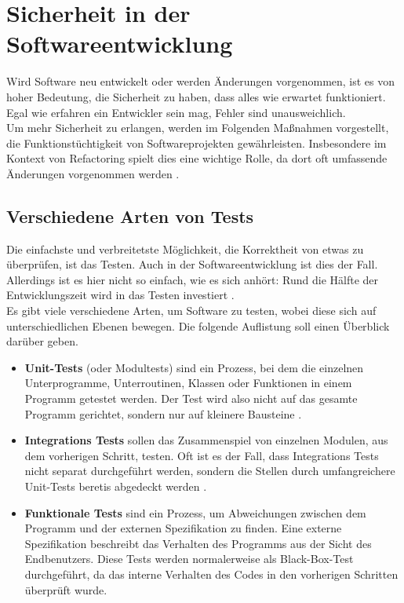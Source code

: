 \chapter{Sicherheit in der Softwareentwicklung}
Wird Software neu entwickelt oder werden Änderungen vorgenommen, ist es von hoher Bedeutung, die Sicherheit zu haben, dass alles wie erwartet funktioniert.
Egal wie erfahren ein Entwickler sein mag, Fehler sind unausweichlich.\\
Um mehr Sicherheit zu erlangen, werden im Folgenden Maßnahmen vorgestellt, die Funktionstüchtigkeit von Softwareprojekten gewährleisten. Insbesondere im Kontext von Refactoring spielt dies eine wichtige Rolle, da dort oft umfassende Änderungen vorgenommen werden \citep[S. 323]{fiveLines.2023}.
\section{Verschiedene Arten von Tests}
Die einfachste und verbreitetste Möglichkeit, die Korrektheit von etwas zu überprüfen, ist das Testen. Auch in der Softwareentwicklung ist dies der Fall. Allerdings ist es hier nicht so einfach, wie es sich anhört: Rund die Hälfte der Entwicklungszeit wird in das Testen investiert \citep[Introduction]{artoftesting.2011}.\\
Es gibt viele verschiedene Arten, um Software zu testen, wobei diese sich auf unterschiedlichen Ebenen bewegen. Die folgende Auflistung soll einen Überblick darüber geben. 
\begin{itemize}
  \item \textbf{Unit-Tests} (oder Modultests) sind ein Prozess, bei dem die einzelnen Unterprogramme, Unterroutinen, Klassen oder Funktionen in einem Programm getestet werden. Der Test wird also nicht auf das gesamte Programm gerichtet, sondern nur auf kleinere Bausteine \citep[S. 85]{artoftesting.2011}.
  \item \textbf{Integrations Tests} sollen das Zusammenspiel von einzelnen Modulen, aus dem vorherigen Schritt, testen. Oft ist es der Fall, dass Integrations Tests nicht separat durchgeführt werden, sondern die Stellen durch umfangreichere Unit-Tests beretis abgedeckt werden \citep[S. 117 f.]{artoftesting.2011}.
  \item \textbf{Funktionale Tests} sind ein Prozess, um Abweichungen zwischen dem Programm und der externen Spezifikation zu finden. Eine externe Spezifikation beschreibt das Verhalten des Programms aus der Sicht des Endbenutzers. Diese Tests werden normalerweise als Black-Box-Test durchgeführt, da das interne Verhalten des Codes in den vorherigen Schritten überprüft wurde. \citep[S. 119]{artoftesting.2011}
\end{itemize}
